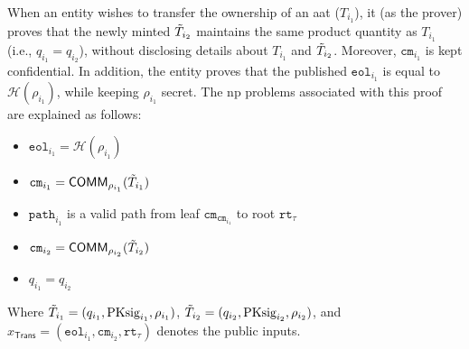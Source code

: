 When an entity wishes to transfer the ownership of an \gls{aat} ($T_{i_1}$), it (as the prover) proves that the newly minted $\Tilde{T}_{i_2}$ maintains the same product quantity as $T_{i_1}$ (i.e., $q_{i_1} = q_{i_2}$), without disclosing details about $T_{i_1}$ and $\Tilde{T}_{i_2}$. Moreover,  $\texttt{cm}_{i_1}$ is kept confidential. In addition, the entity proves that the published $\texttt{eol}_{i_1}$ is equal to $\mathcal{H}(\rho_{i_1})$, while keeping $\rho_{i_1}$ secret. The \gls{np} problems associated with this proof are explained as follows:

\begin{itemize}
	\item $\texttt{eol}_{i_1} = \mathcal{H}(\rho_{i_1} )$
	\item $\texttt{cm}_{i_1} = \mathsf{COMM}_{\rho_{i_1}}(\Tilde{T}_{i_1})$
	\item $\texttt{path}_{{i_1}}$ is a valid path from leaf  $\texttt{cm}_{\texttt{cm}_{i_1}}$ to root $\texttt{rt}_\tau$
	\item $\texttt{cm}_{i_2} = \mathsf{COMM}_{\rho_{i_2}}(\Tilde{T}_{i_2})$
	\item $q_{i_1} = q_{i_2} $
\end{itemize}
Where  $\Tilde{T}_{i_1} = (q_{i_1}, \text{PKsig}_{i_1}, \rho_{i_1})$, $\Tilde{T}_{i_2} = (q_{i_2}, \text{PKsig}_{i_2}, \rho_{i_2})$, and $x_\mathsf{Trans} = (\texttt{eol}_{i_1}, \texttt{cm}_{i_2}, \texttt{rt}_\tau)$ denotes the public inputs.

